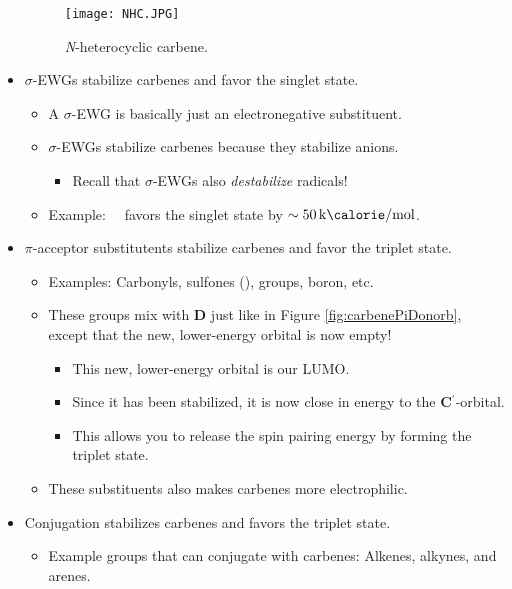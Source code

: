 \documentclass[../notes.tex]{subfiles}
\begin{document}
\begin{itemize}
    \begin{figure}[h!]
        \centering
        \texttt{[image: NHC.JPG]}
        \caption{\emph{N}-heterocyclic carbene.}
        \label{fig:NHC}
    \end{figure}
    \item $\sigma$-EWGs stabilize carbenes and favor the singlet state.
    \begin{itemize}
        \item A $\sigma$-EWG is basically just an electronegative substituent.
        \item $\sigma$-EWGs stabilize carbenes because they stabilize anions.
        \begin{itemize}
            \item Recall that $\sigma$-EWGs also \emph{destabilize} radicals!
        \end{itemize}
        \item Example: \ \ favors the singlet state by $\sim\kcal{50}$.
    \end{itemize}
    \item $\pi$-acceptor substitutents stabilize carbenes and favor the triplet state.
    \begin{itemize}
        \item Examples: Carbonyls, sulfones (),  groups, boron, etc.
        \item These groups mix with \textbf{D} just like in Figure \ref{fig:carbenePiDonorb}, except that the new, lower-energy orbital is now empty!
        \begin{itemize}
            \item This new, lower-energy orbital is our LUMO.
            \item Since it has been stabilized, it is now close in energy to the \textbf{C${}^{\bm{\prime}}$}-orbital.
            \item This allows you to release the spin pairing energy by forming the triplet state.
        \end{itemize}
        \item These substituents also makes carbenes more electrophilic.
    \end{itemize}
    \item Conjugation stabilizes carbenes and favors the triplet state.
    \begin{itemize}
        \item Example groups that can conjugate with carbenes: Alkenes, alkynes, and arenes.

\end{itemize}
\end{itemize}
\end{document}
